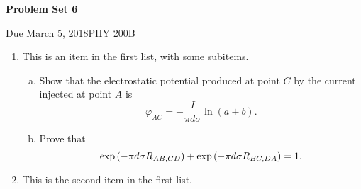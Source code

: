\documentclass{article}
\newcommand{\Title}     {Problem Set 6}
\newcommand{\DueDate}   {March 5, 2018}
\newcommand{\Course}    {PHY 200B}
\begin{document}
{\huge\textbf{\Title}}

Due \DueDate \hfill \Course

\hrulefill

\begin{enumerate}[align=parleft]%
    \item This is an item in the first list, with some subitems.
    \begin{enumerate}[(a), align=parleft,labelsep=26pt]
        \item Show that the electrostatic potential produced at point $C$ by the current injected at point $A$ is
        \[
            \varphi_{AC} = -\frac{I}{\pi d\sigma}\ln(a+b).
        \]

        \item Prove that
        \[
            \exp\pqty{-\pi d\sigma R_{AB,CD}} + \exp\pqty{-\pi d\sigma R_{BC,DA}} = 1.
        \]
    \end{enumerate}
    \item This is the second item in the first list.
\end{enumerate}
\end{document}
